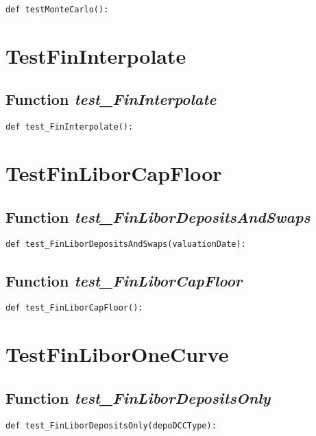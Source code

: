 \documentclass[twoside,11pt]{book}
\begin{document}
\begin{lstlisting}
def testMonteCarlo():
\end{lstlisting}


\newpage
\section{TestFinInterpolate}

\subsection{Function {\it test\_FinInterpolate}}


\begin{lstlisting}
def test_FinInterpolate():
\end{lstlisting}


\newpage
\section{TestFinLiborCapFloor}

\subsection{Function {\it test\_FinLiborDepositsAndSwaps}}


\begin{lstlisting}
def test_FinLiborDepositsAndSwaps(valuationDate):
\end{lstlisting}

\subsection{Function {\it test\_FinLiborCapFloor}}


\begin{lstlisting}
def test_FinLiborCapFloor():       
\end{lstlisting}


\newpage
\section{TestFinLiborOneCurve}

\subsection{Function {\it test\_FinLiborDepositsOnly}}


\begin{lstlisting}
def test_FinLiborDepositsOnly(depoDCCType):
\end{lstlisting}
\end{document}
